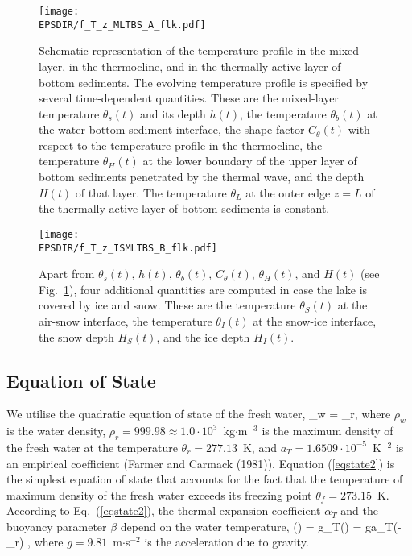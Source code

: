 %
\begin{figure} %
\begin{center}
\texttt{[image: \\EPSDIR/f\_T\_z\_MLTBS\_A\_flk.pdf]}
\begin{minipage}{0.9\textwidth}
\caption{Schematic representation of the temperature profile
in the mixed layer, in the thermocline, 
and in the thermally active layer of bottom sediments.
The evolving temperature profile is specified by several time-dependent quantities. 
These are 
the mixed-layer temperature $\theta_s(t)$ and its depth $h(t)$,
the temperature $\theta_b(t)$ at the water-bottom sediment interface,
the shape factor $C_{\theta}(t)$ with respect to the temperature profile in the thermocline,
the temperature $\theta_H(t)$ at the lower boundary of the upper layer of bottom sediments
penetrated by the thermal wave, and the depth $H(t)$ of that layer.
The temperature $\theta_{L}$ at the outer edge $z=L$
of the thermally active layer of bottom sediments is constant.}
\label{ftr_T_sch_2media}
\end{minipage}
\end{center}
\end{figure}
%
%
\begin{figure} %
\begin{center}
\texttt{[image: \\EPSDIR/f\_T\_z\_ISMLTBS\_B\_flk.pdf]}
\begin{minipage}{0.9\textwidth}
\caption{
Apart from $\theta_s(t)$, $h(t)$, $\theta_b(t)$, $C_{\theta}(t)$, $\theta_H(t)$, and $H(t)$   
(see Fig.~\ref{ftr_T_sch_2media}), 
four additional quantities are computed in case the lake is covered by ice and snow. 
These are 
the temperature $\theta_S(t)$ at the air-snow interface,
the temperature $\theta_I(t)$ at the snow-ice interface,
the snow depth $H_S(t)$, and the ice depth $H_I(t)$.}
\label{ftr_T_sch_4media}
\end{minipage}
\end{center}
\end{figure}
%


\subsection{Equation of State}\label{eqstate}
\nopagebreak 
%
\noindent
We utilise the quadratic equation of state of the fresh water, 
%
\beq\label{eqstate2}
\rho_w = \rho_r ,
\eeq
%
where $\rho_w$ is the water density, 
$\rho_r=999.98\approx1.0\cdot10^3$~kg$\cdot$m$^{-3}$ is the maximum density 
of the fresh water at the temperature $\theta_r=277.13$~K, 
and $a_T=1.6509\cdot 10^{-5}$~K$^{-2}$ is an empirical 
coefficient (Farmer and Carmack (1981)\nocite{farmer1981}). 
Equation (\ref{eqstate2}) is the simplest equation of state that 
accounts for the fact that the temperature of maximum density of 
the fresh water exceeds its freezing point 
$\theta_f=273.15$~K. 
According to Eq.~(\ref{eqstate2}), 
the thermal expansion coefficient 
$\alpha_T$ and the buoyancy parameter $\beta$ 
depend on the water temperature, 
%
\beq\label{buopar}
\beta(\theta) = g\alpha_T(\theta) = ga_T(\theta-\theta_r) ,
\eeq
%
where $g=9.81$~m$\cdot$s$^{-2}$ is the acceleration due to gravity.


